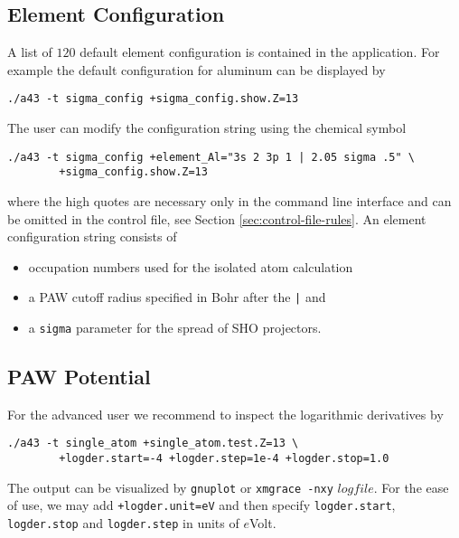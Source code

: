 \documentclass[oribibl]{llncs}
\newcommand{\ttt}[1]{\texttt{#1}}
\begin{document}
\subsection{Element Configuration} \label{sec:sigma-config}
%
A list of $120$ default element configuration is contained in the application.
For example the default configuration for aluminum can be displayed by
\begin{verbatim}
./a43 -t sigma_config +sigma_config.show.Z=13
\end{verbatim}
The user can modify the configuration string using the chemical symbol
\begin{verbatim}
./a43 -t sigma_config +element_Al="3s 2 3p 1 | 2.05 sigma .5" \
 		+sigma_config.show.Z=13
\end{verbatim}
where the high quotes are necessary only in the command line interface
and can be omitted in the control file, see Section \ref{sec:control-file-rules}.
%
\noindent
An element configuration string consists of
\begin{itemize}
	\item occupation numbers used for the isolated atom calculation
	\item a \ac{PAW} cutoff radius specified in Bohr after the \ttt{|} and
	\item a \ttt{sigma} parameter for the spread of \ac{SHO} projectors.
\end{itemize}

\subsection{PAW Potential} \label{sec:single-atom}
%
For the advanced user we recommend to inspect the logarithmic derivatives by
\begin{verbatim}
./a43 -t single_atom +single_atom.test.Z=13 \
        +logder.start=-4 +logder.step=1e-4 +logder.stop=1.0
\end{verbatim}
The output can be visualized by \ttt{gnuplot} or \ttt{xmgrace -nxy} $logfile$.
%
\noindent
For the ease of use, we may add \ttt{+logder.unit=eV} and then specify
\ttt{logder.start}, \ttt{logder.stop} and \ttt{logder.step} in units of $e$Volt.

\end{document}
